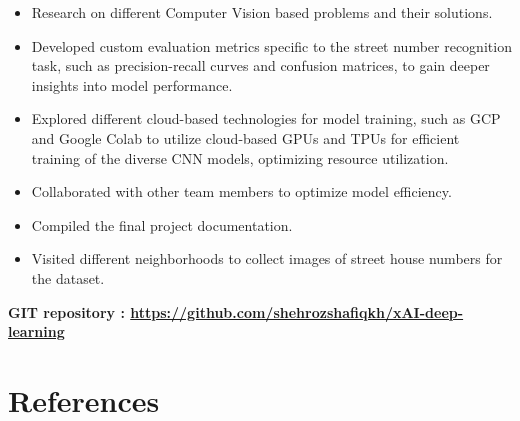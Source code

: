 \documentclass[12pt,a4paper]{article}
\begin{document}
\begin{itemize}
    \item Research on different Computer Vision based problems and their solutions.
    \item Developed custom evaluation metrics specific to the street number recognition task, such as precision-recall curves and confusion matrices, to gain deeper insights into model performance.
    \item Explored different cloud-based technologies for model training, such as GCP and Google Colab to utilize cloud-based GPUs and TPUs for efficient training of the diverse CNN models, optimizing resource utilization.
    \item Collaborated with other team members to optimize model efficiency.
    \item Compiled the final project documentation.
    \item Visited different neighborhoods to collect images of street house numbers for the dataset.
\end{itemize}
\textbf{GIT repository : \url{https://github.com/shehrozshafiqkh/xAI-deep-learning}} 
\vspace{140 mm}
\pagebreak

\section*{References}
\end{document}
